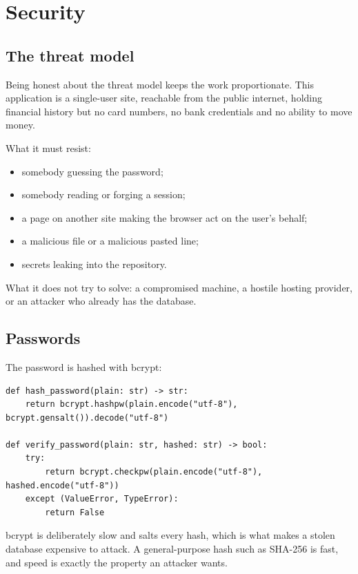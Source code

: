 \chapter{Security}

\section{The threat model}

Being honest about the threat model keeps the work proportionate. This
application is a single-user site, reachable from the public internet, holding
financial history but no card numbers, no bank credentials and no ability to
move money.

What it must resist:

\begin{itemize}
  \item somebody guessing the password;
  \item somebody reading or forging a session;
  \item a page on another site making the browser act on the user's behalf;
  \item a malicious file or a malicious pasted line;
  \item secrets leaking into the repository.
\end{itemize}

What it does not try to solve: a compromised machine, a hostile hosting
provider, or an attacker who already has the database.

\section{Passwords}

The password is hashed with bcrypt:

\begin{lstlisting}[style=py]
def hash_password(plain: str) -> str:
    return bcrypt.hashpw(plain.encode("utf-8"), bcrypt.gensalt()).decode("utf-8")

def verify_password(plain: str, hashed: str) -> bool:
    try:
        return bcrypt.checkpw(plain.encode("utf-8"), hashed.encode("utf-8"))
    except (ValueError, TypeError):
        return False
\end{lstlisting}

bcrypt is deliberately slow and salts every hash, which is what makes a stolen
database expensive to attack. A general-purpose hash such as SHA-256 is fast,
and speed is exactly the property an attacker wants.

